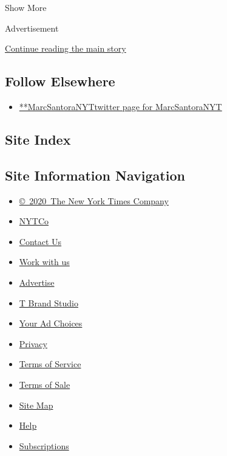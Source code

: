Show More

Advertisement

\protect\hyperlink{after-mid2}{Continue reading the main story}

\hypertarget{follow-elsewhere}{%
\subsection{Follow Elsewhere}\label{follow-elsewhere}}

\begin{itemize}
\tightlist
\item
  \href{https://twitter.com/MarcSantoraNYT}{**MarcSantoraNYTtwitter page
  for MarcSantoraNYT}
\end{itemize}

\hypertarget{site-index}{%
\subsection{Site Index}\label{site-index}}

\hypertarget{site-information-navigation}{%
\subsection{Site Information
Navigation}\label{site-information-navigation}}

\begin{itemize}
\tightlist
\item
  \href{https://help.nytimes.com/hc/en-us/articles/115014792127-Copyright-notice}{©~2020~The
  New York Times Company}
\end{itemize}

\begin{itemize}
\tightlist
\item
  \href{https://www.nytco.com/}{NYTCo}
\item
  \href{https://help.nytimes.com/hc/en-us/articles/115015385887-Contact-Us}{Contact
  Us}
\item
  \href{https://www.nytco.com/careers/}{Work with us}
\item
  \href{https://nytmediakit.com/}{Advertise}
\item
  \href{http://www.tbrandstudio.com/}{T Brand Studio}
\item
  \href{https://www.nytimes.com/privacy/cookie-policy\#how-do-i-manage-trackers}{Your
  Ad Choices}
\item
  \href{https://www.nytimes.com/privacy}{Privacy}
\item
  \href{https://help.nytimes.com/hc/en-us/articles/115014893428-Terms-of-service}{Terms
  of Service}
\item
  \href{https://help.nytimes.com/hc/en-us/articles/115014893968-Terms-of-sale}{Terms
  of Sale}
\item
  \href{https://spiderbites.nytimes.com}{Site Map}
\item
  \href{https://help.nytimes.com/hc/en-us}{Help}
\item
  \href{https://www.nytimes.com/subscription?campaignId=37WXW}{Subscriptions}
\end{itemize}
